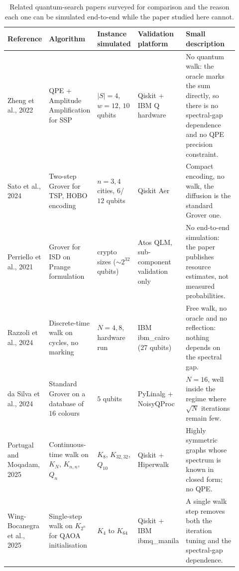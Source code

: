 \documentclass[11pt,a4paper]{article}
\begin{document}
\begin{table}[H]
\centering
\footnotesize
\setlength{\tabcolsep}{4pt}
\begin{tabular}{@{}p{0.18\linewidth} p{0.18\linewidth}
                  p{0.13\linewidth} p{0.18\linewidth}
                  p{0.25\linewidth}@{}}
\toprule
\textbf{Reference} & \textbf{Algorithm} &
\textbf{Instance simulated} & \textbf{Validation platform} &
\textbf{Small description}\\
\midrule
Zheng et al., 2022~\cite{zheng2022}
& QPE + Amplitude Amplification for SSP
& $|S|{=}4$, $w{=}12$, $10$ qubits
& Qiskit + IBM Q hardware
& No quantum walk: the oracle marks the sum directly, so there
is no spectral-gap dependence and no QPE precision constraint.\\
\midrule
Sato et al., 2024~\cite{sato2024}
& Two-step Grover for TSP, HOBO encoding
& $n{=}3,4$ cities, $6$/$12$ qubits
& Qiskit Aer
& Compact encoding, no walk, the diffusion is the standard
Grover one.\\
\midrule
Perriello et al., 2021~\cite{perriello2021}
& Grover for ISD on Prange formulation
& crypto sizes ($\sim 2^{32}$ qubits)
& Atos QLM, sub-component validation only
& No end-to-end simulation: the paper publishes resource
estimates, not measured probabilities.\\
\midrule
Razzoli et al., 2024~\cite{razzoli2024}
& Discrete-time walk on cycles, no marking
& $N=4,8$, hardware run
& IBM \textsf{ibm\_cairo} (27 qubits)
& Free walk, no oracle and no reflection: nothing depends on the
spectral gap.\\
\midrule
da Silva et al., 2024~\cite{dasilva2024}
& Standard Grover on a database of $16$ colours
& $5$ qubits
& PyLinalg + NoisyQProc
& $N=16$, well inside the regime where $\sqrt{N}$ iterations
remain few.\\
\midrule
Portugal and Moqadam, 2025~\cite{portugal2025}
& Continuous-time walk on $K_N$, $K_{n,n}$, $Q_n$
& $K_8$, $K_{32,32}$, $Q_{10}$
& Qiskit + Hiperwalk
& Highly symmetric graphs whose spectrum is known in closed
form; no QPE.\\
\midrule
Wing-Bocanegra et al., 2025~\cite{wingbocanegra2025}
& Single-step walk on $K_{2^n}$ for QAOA initialisation
& $K_4$ to $K_{64}$
& Qiskit + IBM \textsf{ibmq\_manila}
& A single walk step removes both the iteration tuning and the
spectral-gap dependence.\\
\bottomrule
\end{tabular}
\caption{Related quantum-search papers surveyed for comparison and the reason
each one can be simulated end-to-end while the paper studied here cannot.}
\label{tab:papers}
\end{table}
\end{document}
